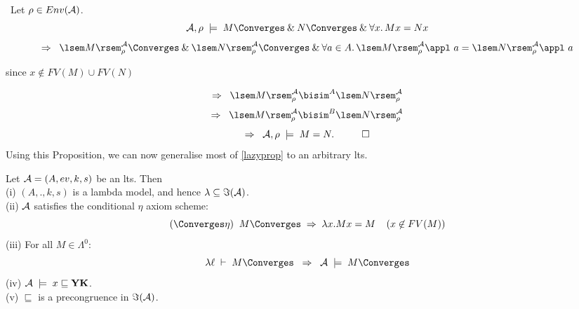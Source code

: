 {\proof\ Let $\rho \in Env({\cal A})$.
\[ {\cal A}, \rho \; \models \; M \Converges \: \& \: N \Converges \: \& \: \forall x . \, M x = N x \]
\[ \Rightarrow \;\; \lsem M \rsem^{{\cal A}}_{\rho} \Converges \: \& \:  
\lsem N \rsem^{{\cal A}}_{\rho} \Converges \: \& \: \forall a \in A . \, \lsem M \rsem^{{\cal A}}_{\rho} \appl\  a = \lsem N \rsem^{{\cal A}}_{\rho} \appl\  a \]
\begin{flushright}
since $x \not\in FV(M) \cup FV(N)$
\end{flushright}
\[ \Rightarrow \;\; \lsem M \rsem^{{\cal A}}_{\rho} \bisim^{A} \lsem N \rsem^{{\cal A}}_{\rho} \]
\[ \Rightarrow \;\; \lsem M \rsem^{{\cal A}}_{\rho} \bisim^{B} \lsem N \rsem^{{\cal A}}_{\rho} \]
\[ \Rightarrow \;\; {\cal A}, {\rho} \; \models \; M = N . \;\;\; \qed \]
Using this Proposition, we can now generalise most of \ref{lazyprop} to an arbitrary lts.
\begin{theorem}
\label{ltsprop}
Let ${\cal A} = (A, ev, k, s)$ be an lts. Then \\
(i) $(A, ., k, s)$ is a lambda model, and hence $\lambda \subseteq {\Im}({\cal A})$. \\
(ii) ${\cal A}$ satisfies the conditional $\eta$ axiom scheme:
\[ (\Converges \eta ) \;\; M \Converges \; \Rightarrow \; \lambda x . M x = M \;\;\;\; (x \not\in FV(M)) \]
(iii) For all $M \in \Lambda^{0}$:
\[ \lambda \ell \; \vdash \; M \Converges \;\; \Rightarrow \;\; {\cal A} \; \models \; M \Converges \]
(iv) ${\cal A} \; \models \; x \sqsubseteq {\bf YK}$. \\
(v) $\sqsubseteq$ is a precongruence in ${\Im}({\cal A})$.
\end{theorem}

}
